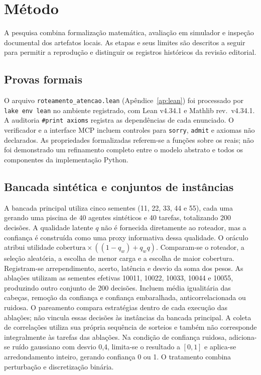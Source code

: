 \chapter{Método}\label{cap:metodo}
A pesquisa combina formalização matemática, avaliação em simulador e inspeção documental dos artefatos locais. As etapas e seus limites são descritos a seguir para permitir a reprodução e distinguir os registros históricos da revisão editorial.
\section{Provas formais}
O arquivo \texttt{roteamento\_atencao.lean} (Apêndice~\ref{ap:lean}) foi processado por \texttt{lake env lean} no ambiente registrado, com Lean v4.34.1 e Mathlib rev.\ v4.34.1. A auditoria \texttt{\#print axioms} registra as dependências de cada enunciado. O verificador e a interface MCP incluem controles para \texttt{sorry}, \texttt{admit} e axiomas não declarados. As propriedades formalizadas referem-se a funções sobre os reais; não foi demonstrado um refinamento completo entre o modelo abstrato e todos os componentes da implementação Python.
\section{Bancada sintética e conjuntos de instâncias}
A bancada principal utiliza cinco sementes (11, 22, 33, 44 e 55), cada uma gerando uma piscina de 40 agentes sintéticos e 40 tarefas, totalizando 200 decisões. A qualidade latente $q$ não é fornecida diretamente ao roteador, mas a confiança é construída como uma proxy informativa dessa qualidade. O oráculo atribui utilidade $\mathrm{cobertura}\times((1-q_w)+q_wq)$. Comparam-se o roteador, a seleção aleatória, a escolha de menor carga e a escolha de maior cobertura. Registram-se arrependimento, acerto, latência e desvio da soma dos pesos.
As ablações utilizam as sementes efetivas 10011, 10022, 10033, 10044 e 10055, produzindo outro conjunto de 200 decisões. Incluem média igualitária das cabeças, remoção da confiança e confiança embaralhada, anticorrelacionada ou ruidosa. O pareamento compara estratégias dentro de cada execução das ablações; não vincula essas decisões às instâncias da bancada principal. A coleta de correlações utiliza sua própria sequência de sorteios e também não corresponde integralmente às tarefas das ablações.
Na condição de confiança ruidosa, adiciona-se ruído gaussiano com desvio 0,4, limita-se o resultado a $[0,1]$ e aplica-se arredondamento inteiro, gerando confiança 0 ou 1. O tratamento combina perturbação e discretização binária.
